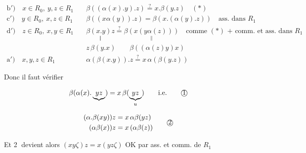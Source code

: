 \[
\begin{aligned}
\text{b$'$)}\quad x\in R_0,\ y,z\in R_1&\quad\beta((\alpha(x).y).z)\overset?=x.\beta(y.z)\quad (\ast)\\
\text{c$'$)}\quad y\in R_0,\ x,z\in R_1&\quad\beta((x\alpha(y)).z)=\beta(x.(\alpha(y).z))\quad\text{ass. dans $R_1$}\\
\text{d$'$)}\quad z\in R_0,\ x,y\in R_1&\quad\underset{\Vert}{\beta(x.y)z}\overset?=\underset{\Vert}{\beta(x(y\alpha(z)))}\quad\text{comme $(\ast)$ + comm. et ass. dans $R_1$}\\
&\quad z\,\beta(y.x)\qquad\beta((\alpha(z)y)x)\\
\text{a$'$)}\quad x,y,z\in R_1&\quad\alpha(\beta(x.y)).z\overset?=x\,\alpha(\beta(y.z))
\end{aligned}
\]

Donc il faut vérifier

\[
\beta(\alpha(x).\underbrace{yz})=x\,\beta(\underbrace{yz}_{u})\qquad\text{i.e.}\tag*{\textcircled{1}}
\]


\[
\begin{aligned}
(\alpha.\beta(xy))z&=x\,\alpha\beta(yz)\\
(\alpha\beta(x))z&=x\,(\alpha\beta(z))
\end{aligned}\tag*{\textcircled{2}}
\]


Et \textcircled{2} devient alors $(xy\zeta)z=x(yz\zeta)$ OK par ass. et comm. de $R_1$


